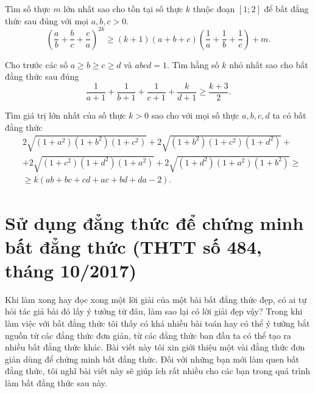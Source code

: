 {\begin{bt} [THTT T10/2007] %
	Tìm số thực $m$ lớn nhất sao cho tồn tại số thực $k$ thuộc đoạn $[1;2]$ để bất đẳng thức sau đúng với mọi $a,b,c>0.$
	$$\left ( \frac{a}{b}+\frac{b}{c}+\frac{c}{a} \right )^{2k}\geq \left ( k+1 \right )\left ( a+b+c \right )\left ( \frac{1}{a} +\frac{1}{b} +\frac{1}{c} \right )+m.  $$
\end{bt}
\begin{bt} [THTT 2012]%
	Cho trước các số $a\ge b\ge c\ge d$ và $abcd=1.$ Tìm hằng số $k$ nhỏ nhất sao cho bất đẳng thức sau đúng 
	$$\frac{1}{a+1}+\frac{1}{b+1}+\frac{1}{c+1}+\frac{k}{d+1}\geq \frac{k+3}{2}.  $$
\end{bt}
\begin{bt} %
	Tìm giá trị lớn nhất của số thực $k>0$ sao cho với mọi số thực $a,b,c,d$ ta có bất đẳng thức
	\begin{align*}
	&2\sqrt{\left ( 1+a^2 \right )\left ( 1+b^2 \right )\left ( 1+c^2 \right )}+2\sqrt{\left ( 1+b^2 \right )\left ( 1+c^2 \right )\left ( 1+d^2 \right )}+\\
	&+2\sqrt{\left ( 1+c^2 \right )\left ( 1+d^2 \right )\left ( 1+a^2 \right )}+2\sqrt{\left ( 1+d^2 \right )\left ( 1+a^2 \right )\left ( 1+b^2 \right )} \geq \\
	&\geq k\left ( ab+bc+cd+ac+bd+da-2 \right ).
	\end{align*}
\end{bt}

\section{Sử dụng đẳng thức để chứng minh bất đẳng thức (THTT số 484, tháng 10/2017)}
\begin{center}
	\textbf{\color{violet}{Nguyễn Ngọc Tú\\
			(GV THPT Chuyên Hà Giang)}}
\end{center}
Khi làm xong hay đọc xong một lời giải của một bài bất đẳng thức đẹp, có ai tự hỏi tác giả bài đó lấy ý tưởng từ đâu, làm sao lại có lời giải đẹp vậy? Trong khi làm việc với bất đẳng thức tôi thấy có khá nhiều bài toán hay có thể ý tưởng bắt nguồn từ các đẳng thức đơn giản, từ các đẳng thức ban đầu ta có thể tạo ra nhiều bất đẳng thức khác. Bài viết này tôi xin giới thiệu một vài đẳng thức đơn giản dùng để chứng minh bất đẳng thức. Đối với những bạn mới làm quen bất đẳng thức, tôi nghĩ bài viết này sẽ giúp ích rất nhiều cho các bạn trong quá trình làm bất đẳng thức sau này.
}
